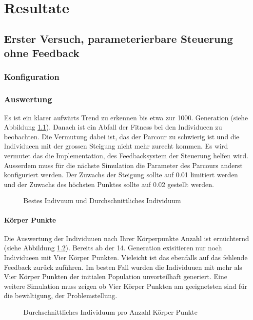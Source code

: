 %
%


\chapter{Resultate\label{chap:Resulate}}

\section{Erster Versuch, parameterierbare Steuerung ohne Feedback}

  \subsection{Konfiguration}
      

  \subsection{Auswertung}
    Es ist ein klarer aufwärts Trend zu erkennen bis etwa zur 1000. Generation (siehe Abbildung \ref{fig:graph}).
    Danach ist ein Abfall der Fitness bei den Individueen zu beobachten.
    Die Vermutung dabei ist, das der Parcour zu schwierig ist und die Individueen
    mit der grossen Steigung nicht mehr zurecht kommen. Es wird vermutet das die Implementation,
    des Feedbacksystem der Steuerung helfen wird. Ausserdem muss für die nächste Simulation
    die Parameter des Parcours anderst konfiguriert werden.
    Der Zuwachs der Steigung sollte auf 0.01 limitiert werden und der Zuwachs des höchsten Punktes
    sollte auf 0.02 gestellt werden.
      \begin{figure}
        
        \caption{Bestes Indivuum und Durchschnittliches Individuum}
        \label{fig:graph}
      \end{figure}

  \subsubsection{Körper Punkte}
    Die Auswertung der Individuuen nach Ihrer Körperpunkte Anzahl ist ernüchternd (siehe Abbildung \ref{fig:graphBp}).
    Bereits ab der 14. Generation exisitieren nur noch Individueen mit Vier Körper Punkten.
    Vieleicht ist das ebenfalls auf das fehlende Feedback zurück zuführen. Im besten Fall
    wurden die Individuuen mit mehr als Vier Körper Punkten der initialen Population unvorteilhaft generiert.
    Eine weitere Simulation muss zeigen ob Vier Körper Punkten am geeignetsten sind für die bewältigung,
    der Problemstellung.
  \begin{figure}
    
    \caption{Durchschnittliches Individuum pro Anzahl Körper Punkte}
    \label{fig:graphBp}
  \end{figure}
